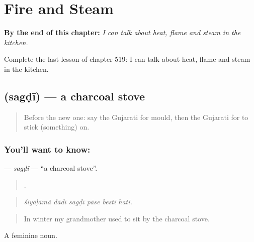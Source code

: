 
\chapter{Fire and Steam}
\label{ch:gu-fire-and-steam}

\begin{chapteropening}
\textbf{By the end of this chapter:} \emph{I can talk about heat, flame and steam in the kitchen.}

Complete the last lesson of chapter 519: I can talk about heat, flame and steam in the kitchen.
\end{chapteropening}

\section[\texorpdfstring{\gu{સગડી} (sagḍī)}{સગડી (sagḍī)}]{ (sagḍī) — a charcoal stove}

\label{lesson:GU-C519-sagdi}



\begin{quote}
Before the new one: say the Gujarati for mould, then the Gujarati for to stick (something) on.
\end{quote}

\subsection*{You'll want to know: }
\textbf{} — \emph{sagḍī} — \textquotedblleft{}a charcoal stove\textquotedblright{}.

\begin{quote}
     .
\end{quote}

\begin{quote}
\emph{śiyāḷāmā̃ dādī sagḍī pāse bestī hatī.}
\end{quote}

\begin{quote}
In winter my grandmother used to sit by the charcoal stove.
\end{quote}

A feminine noun.

